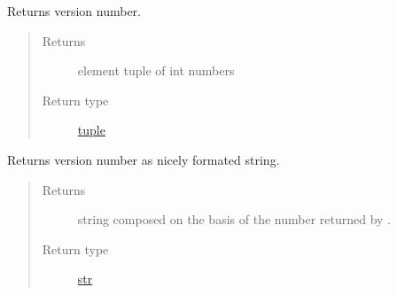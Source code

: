 \documentclass[a4paper,10pt,english]{sphinxmanual}
\begin{document}
\begin{fulllineitems}
\label{aqueduct:aqueduct.version}
Returns {\hyperref[aqueduct:module\string-aqueduct]{}} version number.
\begin{quote}\begin{description}
\item[{Returns}]  element tuple of int numbers

\item[{Return type}] \leavevmode
\href{http://docs.python.org/2/library/functions.html\#tuple}{tuple}

\end{description}\end{quote}

\end{fulllineitems}


\begin{fulllineitems}
\label{aqueduct:aqueduct.version_nice}
Returns {\hyperref[aqueduct:module\string-aqueduct]{}} version number as nicely formated string.
\begin{quote}\begin{description}
\item[{Returns}] \leavevmode
string composed on the basis of the number returned by {\hyperref[aqueduct:aqueduct.version]{}}.

\item[{Return type}] \leavevmode
\href{http://docs.python.org/2/library/functions.html\#str}{str}

\end{description}\end{quote}

\end{fulllineitems}

\end{document}
